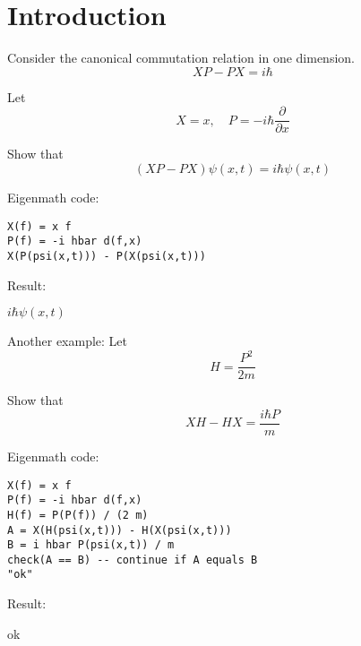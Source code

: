 

\section*{Introduction}

Consider the canonical commutation relation in one dimension.
\begin{equation*}
XP-PX=i\hbar
\end{equation*}

Let
\begin{equation*}
X=x,\quad P=-i\hbar\frac{\partial}{\partial x}
\end{equation*}

Show that
\begin{equation*}
(XP-PX)\psi(x,t)=i\hbar\psi(x,t)
\end{equation*}

Eigenmath code:
{\color{blue}
\begin{verbatim}
X(f) = x f
P(f) = -i hbar d(f,x)
X(P(psi(x,t))) - P(X(psi(x,t)))
\end{verbatim}}

Result:

\bigskip
$i\hbar\psi(x,t)$

\bigskip
Another example: Let
\begin{equation*}
H=\frac{P^2}{2m}
\end{equation*}

Show that
\begin{equation*}
XH-HX=\frac{i\hbar P}{m}
\end{equation*}

Eigenmath code:
{\color{blue}
\begin{verbatim}
X(f) = x f
P(f) = -i hbar d(f,x)
H(f) = P(P(f)) / (2 m)
A = X(H(psi(x,t))) - H(X(psi(x,t)))
B = i hbar P(psi(x,t)) / m
check(A == B) -- continue if A equals B
"ok"
\end{verbatim}}

Result:

\bigskip
ok


